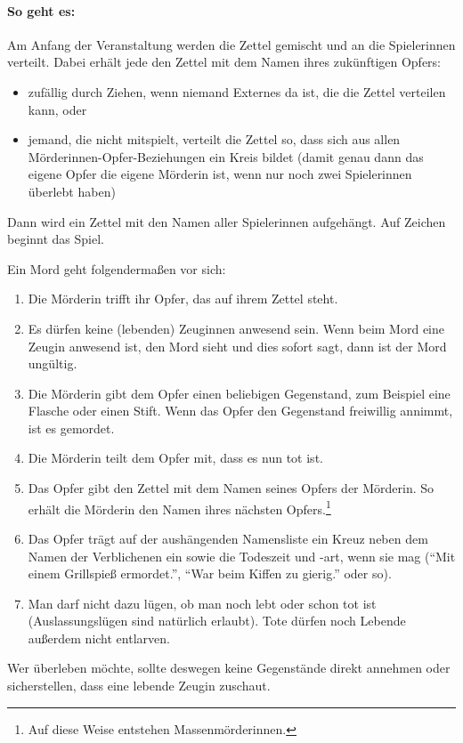 \paragraph{So geht es:} Am Anfang der Veranstaltung werden die Zettel gemischt und an die Spielerinnen verteilt. Dabei erhält jede den Zettel mit dem Namen ihres zukünftigen Opfers:
  \begin{itemize}
    \item zufällig durch Ziehen, wenn niemand Externes da ist, die die Zettel verteilen kann, oder
    \item jemand, die nicht mitspielt, verteilt die Zettel so, dass sich aus allen Mörderinnen-Opfer-Beziehungen ein Kreis bildet (damit genau dann das eigene Opfer die eigene Mörderin ist, wenn nur noch zwei Spielerinnen überlebt haben)
  \end{itemize}
Dann wird ein Zettel mit den Namen aller Spielerinnen aufgehängt. Auf Zeichen beginnt das Spiel.

Ein Mord geht folgendermaßen vor sich:
  \begin{enumerate}
    \item Die Mörderin trifft ihr Opfer, das auf ihrem Zettel steht.
    \item Es dürfen keine (lebenden) Zeuginnen anwesend sein. Wenn beim Mord eine Zeugin anwesend ist, den Mord sieht und dies sofort sagt, dann ist der Mord ungültig.
    \item Die Mörderin gibt dem Opfer einen beliebigen Gegenstand, zum Beispiel eine Flasche oder einen Stift. Wenn das Opfer den Gegenstand freiwillig annimmt, ist es gemordet.
    \item Die Mörderin teilt dem Opfer mit, dass es nun tot ist.
    \item Das Opfer gibt den Zettel mit dem Namen seines Opfers der Mörderin. So erhält die Mörderin den Namen ihres nächsten Opfers.\footnote{Auf diese Weise entstehen Massenmörderinnen.}
    \item Das Opfer trägt auf der aushängenden Namensliste ein Kreuz neben dem Namen der Verblichenen ein sowie die Todeszeit und -art, wenn sie mag ("`Mit einem Grillspieß ermordet."', "`War beim Kiffen zu gierig."' oder so).
    \item Man darf nicht dazu lügen, ob man noch lebt oder schon tot ist (Auslassungslügen sind natürlich erlaubt). Tote dürfen noch Lebende außerdem nicht entlarven.
  \end{enumerate}
Wer überleben möchte, sollte deswegen keine Gegenstände direkt annehmen oder sicherstellen, dass eine lebende Zeugin zuschaut.

